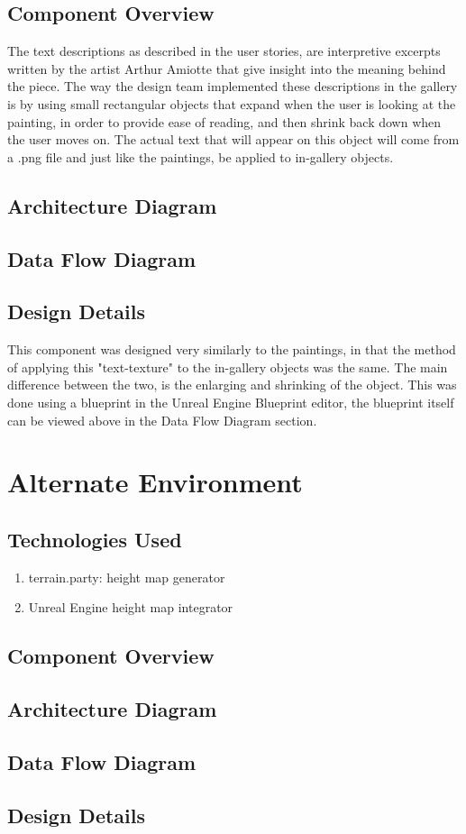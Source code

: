 \subsection{Component Overview}
The text descriptions as described in the user stories, are interpretive excerpts written by the artist Arthur Amiotte that give insight into the meaning behind the piece.  The way the design team implemented these descriptions in the gallery is by using small rectangular objects that expand when the user is looking at the painting, in order to provide ease of reading, and then shrink back down when the user moves on.  The actual text that will appear on this object will come from a .png file and just like the paintings, be applied to in-gallery objects. 

\subsection{Architecture Diagram}
\subsection{Data Flow Diagram}

\subsection{Design Details}
This component was designed very similarly to the paintings, in that the method of applying this "text-texture" to the in-gallery objects was the same.  The main difference between the two, is the enlarging and shrinking of the object.  This was done using a blueprint in the Unreal Engine Blueprint editor, the blueprint itself can be viewed above in the Data Flow Diagram section.  

\section{Alternate Environment}
\subsection{Technologies Used}
\begin{enumerate}
\item terrain.party:  height map generator
\item Unreal Engine height map integrator
\end{enumerate}
\subsection{Component Overview}
\subsection{Architecture Diagram}
\subsection{Data Flow Diagram}
\subsection{Design Details}

